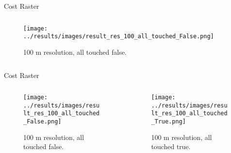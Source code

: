 \documentclass[usenames,dvipsnames,aspectratio=169]{beamer}
\begin{document}
\begin{frame}{Cost Raster}
	\begin{columns}[T] %
		\begin{column}{.48\textwidth}
			\begin{figure}[htb]
				\texttt{[image: ../results/images/result\_res\_100\_all\_touched\_False.png]}
				\caption{100 m resolution, all touched false.}
			\end{figure}
		\end{column}
		\begin{column}{.48\textwidth}
			
		\end{column}
	\end{columns}
\end{frame}

\begin{frame}{Cost Raster}
	\begin{columns}[T] %
		\begin{column}{.48\textwidth}
			\begin{figure}[htb]
				\texttt{[image: ../results/images/result\_res\_100\_all\_touched\_False.png]}
				\caption{100 m resolution, all touched false.}
			\end{figure}
		\end{column}
		\begin{column}{.48\textwidth}
			\begin{figure}[htb]
				\texttt{[image: ../results/images/result\_res\_100\_all\_touched\_True.png]}
				\caption{100 m resolution, all touched true.}
			\end{figure}
		\end{column}
	\end{columns}
\end{frame}

\end{document}
